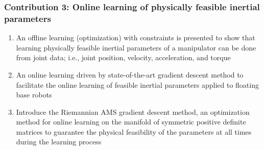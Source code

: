 \documentclass[12pt, a4paper]{article}
\begin{document}
\subsubsection*{Contribution 3: Online learning of physically feasible inertial parameters}
\begin{enumerate}
	\item An offline learning (optimization) with constraints is presented to show that learning physically feasible inertial parameters of a manipulator can be done from joint data; i.e., joint position, velocity, acceleration, and torque
	\item An online learning driven by state-of-the-art gradient descent method to facilitate the online learning of feasible inertial parameters applied to floating base robots 
	\item Introduce the Riemannian AMS gradient descent method, an optimization method for online learning on the manifold of symmetric positive definite matrices to guarantee the physical feasibility of the parameters at all times during the learning process
\end{enumerate}
\end{document}

